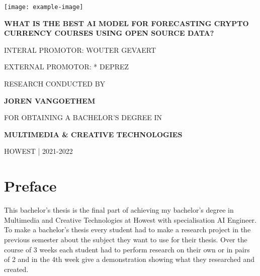 \documentclass{article}
\begin{document}
\begin{titlepage}
    \begin{center}
        \texttt{[image: example-image]}
    \end{center}
    \begin{adjustwidth}{1.5cm}{1.5cm}

    \vspace{0.5em}

    \MakeUppercase{\huge\textbf{What is the best AI model for forecasting crypto currency courses using open source data?}}


    \vspace{1em}

    \MakeUppercase{Interal promotor: Wouter Gevaert}

    \MakeUppercase{External promotor: * Deprez}

    \vspace{1em}

    \MakeUppercase{\small{Research conducted by}}

    \MakeUppercase{\Large\textbf{{Joren vanGoethem}}}

    \MakeUppercase{\small{for obtaining a bachelor's degree in}}

    \MakeUppercase{\Large{\textbf{{Multimedia \& Creative Technologies}}}}

    \MakeUppercase{Howest | 2021-2022}
    \end{adjustwidth}
\end{titlepage}




\newpage
\newpage
\section*{Preface}
This bachelor's thesis is the final part of achieving my bachelor's degree in Multimedia and Creative Technologies at Howest with specialisation AI Engineer.
To make a bachelor's thesis every student had to make a research project in the previous semester about the subject they want to use for their thesis. Over the course of 3 weeks each student had to perform research on their own or in pairs of 2 and in the 4th week give a demonstration showing what they researched and created.
\end{document}

